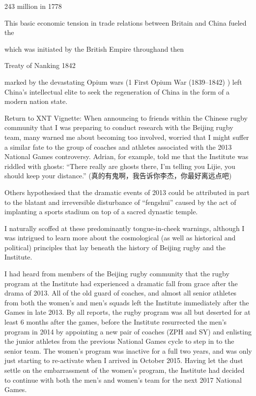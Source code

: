 243 million in 1778

This basic economic tension in trade relations between Britain and China fueled the

 which was initiated by the British Empire throughand then

Treaty of Nanking 1842

marked by the devastating Opium wars (1 First Opium War (1839–1842) ) left China's intellectual elite to seek the regeneration of China in the form of a modern nation state.









Return to XNT Vignette:
When announcing to friends within the Chinese rugby community that I was preparing to conduct research with the Beijing rugby team, many warned me about becoming too involved, worried that I might suffer a similar fate to the group of coaches and athletes associated with the 2013 National Games controversy.  Adrian, for example, told me that the Institute was riddled with ghosts: ``There really are ghosts there, I'm telling you Lijie, you should keep your distance.'' (真的有鬼啊，我告诉你李杰，你最好离远点吧)

  Others hypothesised that the dramatic events of 2013 could be attributed in part to the blatant and irreversible disturbance of ``fengshui'' caused by the act of implanting a sports stadium on top of a sacred dynastic temple.

I naturally scoffed at these predominantly tongue-in-cheek warnings, although I was intrigued to learn more about the cosmological (as well as historical and political) principles that lay beneath the history of Beijing rugby and the Institute.

I had heard from members of the Beijing rugby community that the rugby program at the Institute had experienced a dramatic fall from grace after the drama of 2013.  All of the old guard of coaches, and almost all senior athletes from both the women's and men's squads left the Institute immediately after the Games in late 2013.  By all reports, the rugby program was all but deserted for at least 6 months after the games, before the Institute resurrected the men's program in 2014 by appointing a new pair of coaches (ZPH and SY) and enlisting the junior athletes from the previous National Games cycle to step in to the senior team.  The women's program was inactive for a full two years, and was only just starting to re-activate when I arrived in October 2015.  Having let the dust settle on the embarrassment of the women's program, the Institute had decided to continue with both the men's and women's team for the next 2017 National Games.



